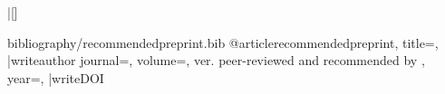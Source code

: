 \newcommand{\writeauthor}{author={\citeauthors},}
\newcommand{\writeDOI}{doi={\preprintDOI},}

\filecontentsspecials|[]
\begin{filecontents*}[overwrite]{bibliography/recommendedpreprint.bib}
@article{recommendedpreprint,
  title={\preprinttitle},
  |writeauthor%
  journal={\preprintserver},
  volume={\preprintnumber, ver. \preprintversion \space peer-reviewed and recommended by \emph{\PCI}},
  year={\pubyear},
  |writeDOI
}
\end{filecontents*}





\newcommand{\mybibexclude}[1]{\addtocategory{ignore}{#1}}
\usepackage{nameref}
\usepackage[pdfborder={0 0 0}]{hyperref}  %


\usepackage{graphbox}  %
\usepackage{floatrow}
\usepackage[justification=centering]{caption} %

\usepackage{microtype}
\setlength{\parindent}{0.4cm}
\linespread{1.2}
\RequirePackage[default,scale=0.90]{opensans}
\usepackage{xcolor}
\usepackage{changepage}
\usepackage[aboveskip=1pt,labelfont=bf,labelsep=period,singlelinecheck=off]{caption}


